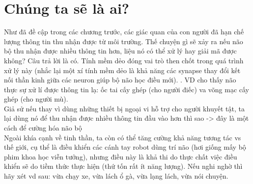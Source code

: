 \documentclass{article}
\newcommand\tab[1][1cm]{\hspace*{#1}}
\begin{document}
\section{Chúng ta sẽ là ai?}
\tab Như đã đề cập trong các chương trước, các giác quan của con người đã hạn chế lượng thông tin thu nhận 
được từ môi trường. Thế chuyện gì sẽ xảy ra nếu não bộ thu nhận được nhiều thông tin hơn, liệu nó có thể xử lý
hay giải mã được không? Câu trả lời là có. Tính mềm dẻo đóng vai trò then chốt trong quá trình xử lý này (nhắc lại
một xí tính mềm dẻo là khả năng các synapse thay đổi kết nối thần kinh giữa các neuron giúp bộ não học điều mới).
. VD cho thấy não thực sự xử lí được thông tin lạ: ốc tai cấy ghép (cho người điếc) va võng mạc cấy ghép
(cho người mù). \\
\tab Giả sử nếu thay vì dùng những thiết bị ngoại vi hỗ trợ cho người khuyết tật, ta lại dùng nó để thu nhận được
nhiều thông tin đầu vào hơn thì sao -> đây là một cách để cường hóa não bộ\\
\tab Ngoài khía cạnh về tinh thần, ta còn có thể tăng cường khả năng tương tác vs thế giới, cụ thể là điều khiển các
cánh tay robot dùng trí não (hơi giống mấy bộ phim khoa học viễn tưởng), nhưng điều này là khả thi do thực chất việc 
điều khiển sẽ do tiềm thức thực hiện (thứ tốn rất ít năng lượng). Nếu nghi nghờ thì hãy xét vd sau: vừa chạy xe, vừa 
lách ổ gà, vừa lạng lách, vừa nói chuyện.\\
\end{document}
